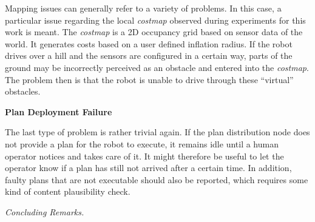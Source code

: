 \documentclass[english, master, utf8]{base/thesis_KBS}
\begin{document}
\noindent
Mapping issues can generally refer to a variety of problems. In this case, a particular issue regarding the local \textit{costmap} observed during experiments for this work is meant.
The \textit{costmap} is a 2D occupancy grid based on sensor data of the world. It generates costs based on a user defined inflation radius.
If the robot drives over a hill and the sensors are configured in a certain way, parts of the ground may be incorrectly perceived as an obstacle and entered into the \textit{costmap}.
The problem then is that the robot is unable to drive through these ``virtual'' obstacles. \newline

\noindent
\textbf{Plan Deployment Failure}\newline

\noindent
The last type of problem is rather trivial again. If the plan distribution node does not provide a plan for the robot to execute, it remains idle until a human operator 
notices and takes care of it. It might therefore be useful to let the operator know if a plan has still not arrived after a certain time.
In addition, faulty plans that are not executable should also be reported, which requires some kind of content plausibility check.\newline

\noindent
\textit{Concluding Remarks.}\newline
\end{document}
